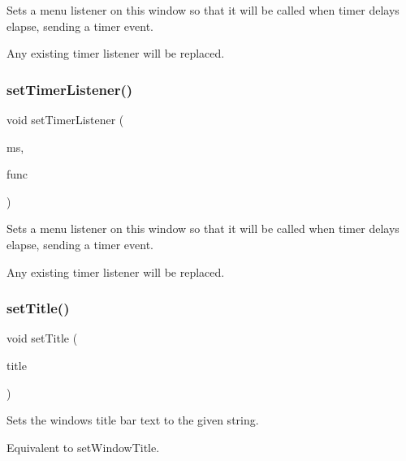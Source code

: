 Sets a menu listener on this window so that it will be called when timer delays elapse, sending a timer event. 

Any existing timer listener will be replaced. \mbox{\label{classGWindow_ae23e03c86580bbcefc2dee4d01d08091}} 
\subsubsection{\texorpdfstring{set\+Timer\+Listener()}{setTimerListener()}\hspace{0.1cm}{\footnotesize\ttfamily [2/2]}}
{\footnotesize\ttfamily void set\+Timer\+Listener (\begin{DoxyParamCaption}\item[{double}]{ms,  }\item[{G\+Event\+Listener\+Void}]{func }\end{DoxyParamCaption})\hspace{0.3cm}{\ttfamily [virtual]}}



Sets a menu listener on this window so that it will be called when timer delays elapse, sending a timer event. 

Any existing timer listener will be replaced. \mbox{\label{classGWindow_abc79cf0667bbb5c93fca3f01b52c7b57}} 
\subsubsection{\texorpdfstring{set\+Title()}{setTitle()}}
{\footnotesize\ttfamily void set\+Title (\begin{DoxyParamCaption}\item[{const std\+::string \&}]{title }\end{DoxyParamCaption})\hspace{0.3cm}{\ttfamily [virtual]}}



Sets the window\textquotesingle{}s title bar text to the given string. 

Equivalent to set\+Window\+Title. \mbox{\label{classGWindow_a18e44e30b31525a243960ca3928125aa}} 

